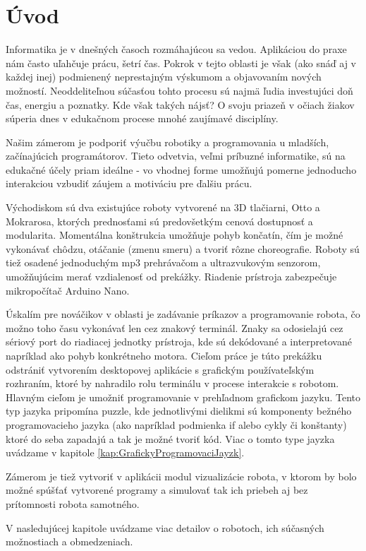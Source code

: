 
\chapter*{Úvod} %

Informatika je v dnešných časoch rozmáhajúcou sa vedou. Aplikáciou do praxe nám často uľahčuje prácu, šetrí čas. Pokrok v tejto oblasti je však (ako snáď aj v každej inej) podmienený neprestajným výskumom a objavovaním nových možností. Neoddeliteľnou súčasťou tohto procesu sú najmä ľudia investujúci doň čas, energiu a poznatky. Kde však takých nájsť? O svoju priazeň v očiach žiakov súperia dnes v edukačnom procese mnohé zaujímavé disciplíny.

Našim zámerom je podporiť výučbu robotiky a programovania u mladších, začínajúcich programátorov. Tieto odvetvia, veľmi príbuzné informatike, sú na edukačné  účely priam ideálne - vo vhodnej forme umožňujú pomerne jednoducho interakciou vzbudiť záujem a motiváciu pre ďalšiu prácu.

Východiskom sú dva existujúce roboty vytvorené na 3D tlačiarni, Otto a Mokrarosa, ktorých prednosťami sú predovšetkým cenová dostupnosť a modularita. Momentálna konštrukcia umožňuje pohyb končatín, čím je možné vykonávať chôdzu, otáčanie (zmenu smeru) a tvoriť rôzne choreografie. Roboty sú tiež osadené jednoduchým mp3 prehrávačom a ultrazvukovým senzorom, umožňujúcim merať vzdialenosť od prekážky. Riadenie prístroja zabezpečuje mikropočítač Arduino Nano.

Úskalím pre nováčikov v oblasti je zadávanie príkazov a programovanie robota, čo možno toho času vykonávať len cez znakový terminál. Znaky sa odosielajú cez sériový port do riadiacej jednotky prístroja, kde sú dekódované a interpretované napríklad ako pohyb konkrétneho motora. Cieľom práce je túto prekážku odstrániť vytvorením desktopovej aplikácie s grafickým používateľským rozhraním, ktoré by nahradilo rolu terminálu v procese interakcie s robotom. Hlavným cieľom je umožniť programovanie v prehľadnom grafickom jazyku. Tento typ jazyka pripomína puzzle, kde jednotlivými dielikmi sú komponenty bežného programovacieho jazyka (ako napríklad podmienka if alebo cykly či konštanty) ktoré do seba zapadajú a tak je možné tvoriť kód. Viac o tomto type jayzka uvádzame v kapitole \ref{kap:GrafickyProgramovaciJayzk}.

Zámerom je tiež vytvoriť v aplikácii modul vizualizácie robota, v ktorom by bolo možné spúšťať vytvorené programy a simulovať tak ich priebeh aj bez prítomnosti robota samotného.

V nasledujúcej kapitole uvádzame viac detailov o robotoch, ich súčasných možnostiach a obmedzeniach.
